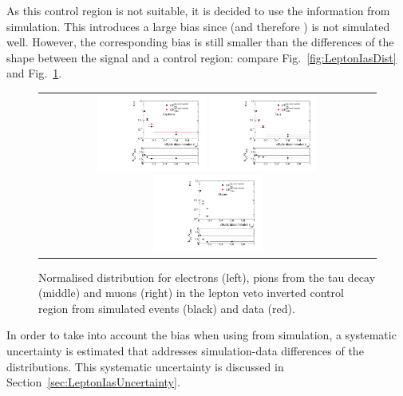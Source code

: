 As this control region is not suitable, it is decided to use the \ias information from simulation.
This introduces a large bias since \dedx (and therefore \ias) is not simulated well.
However, the corresponding bias is still smaller than the differences of the \ias shape between the signal and a control region: compare Fig.~\ref{fig:LeptonIasDist} and Fig.~\ref{fig:LeptonIasDistData}.
\begin{figure}[!tb]
  \centering 
  \begin{tabular}{c}
    \includegraphics[width=0.33\textwidth]{figures/analysis/Background/hASmi_Electrons_MCCR_DataCR.pdf}
    \includegraphics[width=0.33\textwidth]{figures/analysis/Background/hASmi_Taus_MCCR_DataCR.pdf}
    \includegraphics[width=0.33\textwidth]{figures/analysis/Background/hASmi_Muons_MCCR_DataCR.pdf}
  \end{tabular}
  \caption{Normalised \ias distribution for electrons (left), pions from the tau decay (middle) and muons (right) in the lepton veto inverted control region from simulated events (black) and data (red).}
  \label{fig:LeptonIasDistData}
\end{figure}

In order to take into account the bias when using \ias from simulation, a systematic uncertainty is estimated that addresses simulation-data differences of the \ias distributions.
This systematic uncertainty is discussed in Section~\ref{sec:LeptonIasUncertainty}.
\FloatBarrier
